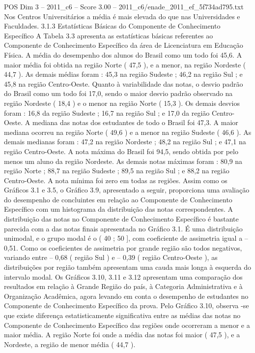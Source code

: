 \begin{textsample}{POS Dim 3 – 2011\_c6 – Score 3.00 – 2011\_c6/enade\_2011\_ef\_5f734ad795.txt}
Nos Centros Universitários a média é mais elevada do que nas Universidades e Faculdades. 3.1.3 Estatísticas Básicas do Componente de Conhecimento Específico A Tabela 3.3 apresenta as estatísticas básicas referentes ao Componente de Conhecimento Específico da área de Licenciatura em Educação Física.
A média do desempenho dos alunos do Brasil como um todo foi 45,6.
A maior média foi obtida na região Norte ( 47,5 ), e a menor, na região Nordeste ( 44,7 ).
As demais médias foram : 45,3 na região Sudeste ; 46,2 na região Sul ; e 45,8 na região Centro-Oeste.
Quanto à variabilidade das notas, o desvio padrão do Brasil como um todo foi 17,0, sendo o maior desvio padrão observado na região Nordeste ( 18,4 ) e o menor na região Norte ( 15,3 ).
Os demais desvios foram : 16,8 da região Sudeste ; 16,7 na região Sul ; e 17,0 da região Centro-Oeste.
A mediana das notas dos estudantes de todo o Brasil foi 47,3.
A maior mediana ocorreu na região Norte ( 49,6 ) e a menor na região Sudeste ( 46,6 ).
As demais medianas foram : 47,2 na região Nordeste ; 48,2 na região Sul ; e 47,1 na região Centro-Oeste.
A nota máxima do Brasil foi 94,5, sendo obtida por pelo menos um aluno da região Nordeste.
As demais notas máximas foram : 80,9 na região Norte ; 88,7 na região Sudeste ; 89,5 na região Sul ; e 88,2 na região Centro-Oeste.
A nota mínima foi zero em todas as regiões.
Assim como os Gráficos 3.1 e 3.5, o Gráfico 3.9, apresentado a seguir, proporciona uma avaliação do desempenho de concluintes em relação ao Componente de Conhecimento Específico com um histograma da distribuição das notas correspondentes.
A distribuição das notas no Componente de Conhecimento Específico é bastante parecida com a das notas finais apresentada no Gráfico 3.1.
É uma distribuição unimodal, e o grupo modal é o ( 40 ; 50 ], com coeficiente de assimetria igual a – 0,51.
Como os coeficientes de assimetria por grande região são todos negativos, variando entre – 0,68 ( região Sul ) e – 0,39 ( região Centro-Oeste ), as distribuições por região também apresentam uma cauda mais longa à esquerda do intervalo modal.
Os Gráficos 3.10, 3.11 e 3.12 apresentam uma comparação dos resultados em relação à Grande Região do país, à Categoria Administrativa e à Organização Acadêmica, agora levando em conta o desempenho de estudantes no Componente de Conhecimento Específico da prova.
Pelo Gráfico 3.10, observa -se que existe diferença estatisticamente significativa entre as médias das notas no Componente de Conhecimento Específico das regiões onde ocorreram a menor e a maior média.
A região Norte foi onde a média das notas foi maior ( 47,5 ), e a Nordeste, a região de menor média ( 44,7 ).

\end{textsample}
